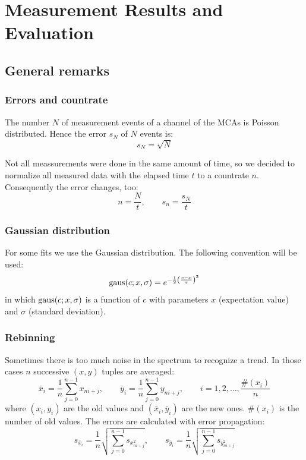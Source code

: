 \section{Measurement Results and Evaluation}

\subsection{General remarks}
\subsubsection{Errors and countrate}
\label{subsub:errorcountrate}
The number $N$ of measurement events of a channel of the MCAs is Poisson distributed. Hence the error $s_N$  of $N$ events is:
\begin{equation}
  s_N = \sqrt{N}
\end{equation}

Not all meassurements were done in the same amount of time, so we decided to normalize all measured data with the elapsed time $t$ to a 
countrate $n$. Consequently the error changes, too:
\begin{equation}
    n = \frac{N}{t}, \qquad s_n = \frac{s_N}{t}
\end{equation}
\subsubsection{Gaussian distribution}
For some fits we use the Gaussian distribution. The following convention will be used:
\begin{equation}
	\label{eq:gaus}
    \operatorname{gaus}(c;x,\sigma) = e^{-\frac{1}{2} \left( \frac{c-x}{\sigma} \right)^2}
\end{equation}
in which $\operatorname{gaus}(c;x,\sigma)$ is a function of $c$ with parameters $x$ (expectation value) and $\sigma$ (standard deviation).

\subsubsection{Rebinning}
\label{subsub:rebinning}
Sometimes there is too much noise in the spectrum to recognize a trend. In those cases $n$ successive $(x, y)$ tuples are averaged:
\begin{equation}
    \bar{x}_i = \frac{1}{n} \sum_{j=0}^{n-1} x_{ni+j}, \qquad \bar{y}_i = \frac{1}{n} \sum_{j=0}^{n-1} y_{ni+j}, \qquad i = 1, 2, \ldots, \frac{\#(x_i)}{n}
\end{equation}
where $(x_i, y_i)$ are the old values and $(\bar{x}_i, \bar{y}_i)$ are the new ones. $\#(x_i)$ is the number of old values.
The errors are calculated with error propagation:
\begin{equation}
    s_{\bar{x}_i} = \frac{1}{n} \sqrt{\sum_{j=0}^{n-1} s_{x_{ni+j}^2}}, \qquad s_{\bar{y}_i} = \frac{1}{n} \sqrt{\sum_{j=0}^{n-1} s_{y_{ni+j}^2}}
\end{equation}


